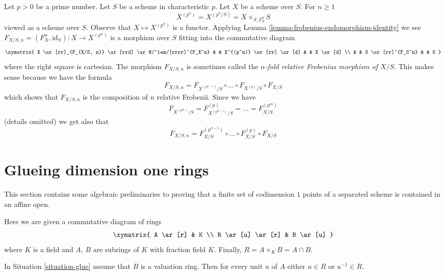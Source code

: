 \begin{remark}
\label{remark-n-fold-relative-frobenius}
Let $p > 0$ be a prime number. Let $S$ be a scheme in characteristic $p$.
Let $X$ be a scheme over $S$. For $n \geq 1$
$$
X^{(p^n)} = X^{(p^n/S)} = X \times_{S, F_S^n} S
$$
viewed as a scheme over $S$. Observe that $X \mapsto X^{(p^n)}$
is a functor. Applying
Lemma \ref{lemma-frobenius-endomorphism-identity}
we see $F_{X/S, n} = (F_X^n, \text{id}_S) : X \longrightarrow X^{(p^n)}$
is a morphism over $S$ fitting into the commutative diagram
$$
\xymatrix{
X \ar[rr]_{F_{X/S, n}} \ar[rrd] \ar@/^1em/[rrrr]^{F_X^n}
& & X^{(p^n)} \ar[rr] \ar[d] & & X \ar[d] \\
& & S \ar[rr]^{F_S^n} & & S
}
$$
where the right square is cartesian. The morphism $F_{X/S, n}$
is sometimes called the
{\it $n$-fold relative Frobenius morphism of $X/S$}.
This makes sense because we have the formula
$$
F_{X/S, n} =
F_{X^{(p^{n - 1})}/S} \circ \ldots \circ F_{X^{(p)}/S} \circ F_{X/S}
$$
which shows that $F_{X/S, n}$ is the composition of $n$ relative
Frobenii. Since we have
$$
F_{X^{(p^m)}/S} = F_{X^{(p^{m - 1})}/S}^{(p)} = \ldots = F_{X/S}^{(p^m)}
$$
(details omitted) we get also that
$$
F_{X/S, n} =
F_{X/S}^{(p^{n - 1})} \circ \ldots \circ F_{X/S}^{(p)} \circ F_{X/S}
$$
\end{remark}




\section{Glueing dimension one rings}
\label{section-glueing-dim-1}

\noindent
This section contains some algebraic preliminaries to proving that
a finite set of codimension $1$ points of a separated scheme is
contained in an affine open.

\begin{situation}
\label{situation-glue}
Here we are given a commutative diagram of rings
$$
\xymatrix{
A \ar[r] & K \\
R \ar[u] \ar[r] & B \ar[u]
}
$$
where $K$ is a field and $A$, $B$ are subrings of $K$ with fraction
field $K$. Finally, $R = A \times_K B = A \cap B$.
\end{situation}

\begin{lemma}
\label{lemma-glue-valuation-ring}
In Situation \ref{situation-glue} assume that $B$ is a valuation ring.
Then for every unit $u$ of $A$ either $u \in R$ or $u^{-1} \in R$.
\end{lemma}

